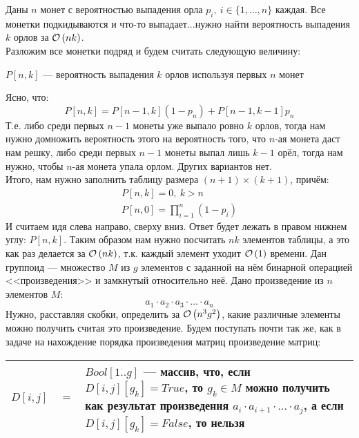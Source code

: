 Даны $n$ монет с вероятностью выпадения орла $p_i,\ i \in \lbrace 1,\ldots,n \rbrace$ каждая. Все монетки подкидываются
и что-то выпадает...нужно найти вероятность выпадения $k$ орлов за $\mathcal{O}\left(nk\right)$.\\
Разложим все монетки подряд и будем считать следующую величину: 
\begin{center}
$P[n,k]$ --- вероятность выпадения $k$ орлов используя первых $n$ монет
\end{center}
Ясно, что:
\[
P[n,k] = P[n-1,k](1-p_n)+P[n-1,k-1]p_n
\]
Т.е. либо среди первых $n-1$ монеты уже выпало ровно $k$ орлов, тогда нам нужно домножить вероятность этого на вероятность
того, что $n$-ая монета даст нам решку, либо среди первых $n-1$ монеты выпал лишь $k-1$ орёл, тогда нам нужно, чтобы 
$n$-ая монета упала орлом. Других вариантов нет.\\
Итого, нам нужно заполнить таблицу размера $(n+1) \times (k+1)$, причём:
\[ 
\begin{array}{c}
P[n,k]=0,\ k > n\\
P[n,0]=\prod_{i=1}^{n}{(1-p_i)} 
\end{array}
\]
И считаем идя слева направо, сверху вниз. Ответ будет лежать в правом нижнем углу: $P[n,k]$. Таким образом нам нужно
посчитать $nk$ элементов таблицы, а это как раз делается за $\mathcal{O}\left(nk\right)$, т.к. каждый элемент уходит $\mathcal{O}\left(1\right)$ времени. \xqed
{}
Дан группоид --- множество $M$ из $g$ элементов с заданной на нём бинарной операцией <<произведения>> и 
замкнутый относительно неё. Дано произведение из $n$ элементов $M$:
\[
	a_1\cdot a_2 \cdot a_3 \cdot \ldots \cdot a_n
\]
Нужно, расставляя скобки, определить за $\mathcal{O}\left(n^3g^2\right)$, какие различные элементы можно получить считая это произведение.
Будем поступать почти так же, как в задаче на нахождение порядка произведения матриц произведение матриц:
\hfill\\
\begin{center}
\begin{tabular}{lcp{15cm}}
\hline
  $D[i,j]$ & $=$ & $Bool[1..g]$ --- массив, что, если $D[i,j][g_k]=True$, то $g_k \in M$ можно получить как результат произведения $a_i\cdot a_{i+1} \cdot \ldots \cdot a_j$, а если $D[i,j][g_k]=False$, то нельзя\\
\hline
\end{tabular}
\end{center}
\hfill\\

